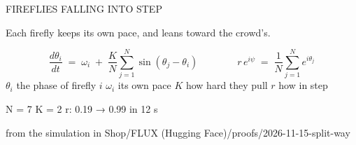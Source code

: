 \documentclass[border=14pt]{standalone}
\begin{document}
\begin{minipage}{118mm}
{\anton\fontsize{26}{28}\selectfont FIREFLIES FALLING INTO STEP}\par\vspace{6pt}
{\large Each firefly keeps its own pace, and leans toward the crowd's.}\par\vspace{10pt}
\[
  \frac{d\theta_i}{dt} \;=\; \omega_i \;+\; \frac{K}{N}\sum_{j=1}^{N} \sin\!\left(\theta_j-\theta_i\right)
  \qquad\qquad
  r\,e^{i\psi} \;=\; \frac{1}{N}\sum_{j=1}^{N} e^{i\theta_j}
\]
\vspace{4pt}
{\manrope\small\color{ink3} $\theta_i$ the phase of firefly $i$ \quad $\omega_i$ its own pace \quad $K$ how hard they pull \quad $r$ how in step}\par\vspace{8pt}
{\ttfamily\footnotesize\color{red} N = 7 \quad K = 2 \quad r: 0.19 → 0.99 in 12 s}\par{\ttfamily\scriptsize\color{ink3} from the simulation in Shop/FLUX (Hugging Face)/proofs/2026-11-15-split-way}
\end{minipage}
\end{document}
